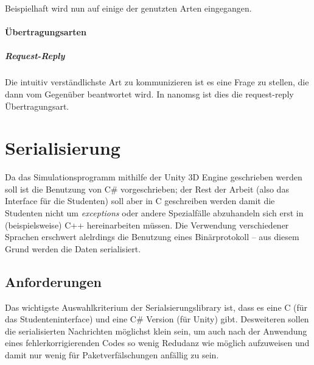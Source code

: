 Beispielhaft wird nun auf einige der genutzten Arten eingegangen.

\paragraph{{\"{U}}bertragungsarten}
\subparagraph{Request-Reply} Die intuitiv verst{\"{a}}ndlichste Art zu kommunizieren ist es eine Frage zu stellen, die dann vom Gegen{\"{u}}ber beantwortet wird. In nanomsg ist dies die request-reply
{\"{U}}bertragungsart.

\clearpage
\section{Serialisierung}

Da das Simulationsprogramm mithilfe der Unity 3D Engine geschrieben werden soll ist die Benutzung von C\#
vorgeschrieben; der Rest der Arbeit (also das Interface f{\"{u}}r die Studenten) soll aber in C geschreiben werden
damit die Studenten nicht um \textit{exceptions} oder andere Spezialf{\"{a}}lle abzuhandeln sich erst in
(beispielsweise) C++ hereinarbeiten m{\"{u}}ssen. Die Verwendung verschiedener Sprachen erschwert alelrdings
die Benutzung eines Bin{\"{a}}rprotokoll -- aus diesem Grund werden die Daten serialisiert.


\subsection{Anforderungen}
Das wichtigste Auswahlkriterium der Serialsierungslibrary ist, dass es eine C (f{\"{u}}r das Studenteninterface) und eine C\# Version (f{\"{u}}r Unity) gibt.
Desweiteren sollen die serialisierten Nachrichten m{\"{o}}glichst klein sein, um auch nach der Anwendung
eines fehlerkorrigierenden Codes so wenig Redudanz wie m{\"{o}}glich aufzuweisen und damit nur wenig f{\"{u}}r Paketverf{\"{a}}lschungen anf{\"{a}}llig zu sein.

